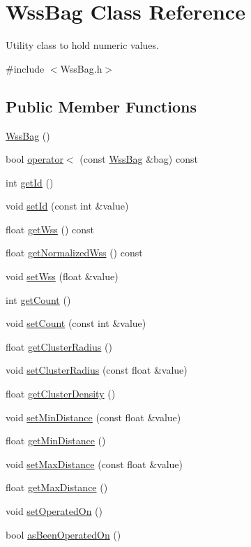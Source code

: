 \hypertarget{class_wss_bag}{}\section{Wss\+Bag Class Reference}
\label{class_wss_bag}


Utility class to hold numeric values.  




{\ttfamily \#include $<$Wss\+Bag.\+h$>$}

\subsection*{Public Member Functions}
\begin{DoxyCompactItemize}
\item 
\hyperlink{class_wss_bag_a67435486174798f81a34887ef2e043b8}{Wss\+Bag} ()
\item 
bool \hyperlink{class_wss_bag_af78f05046f501370d2f9fdd357229d5d}{operator$<$} (const \hyperlink{class_wss_bag}{Wss\+Bag} \&bag) const
\item 
int \hyperlink{class_wss_bag_ac82edcabdc9453934746a78f06cd5532}{get\+Id} ()
\item 
void \hyperlink{class_wss_bag_a0e2859dfdb070ff7a8fe0c5ba4135af7}{set\+Id} (const int \&value)
\item 
float \hyperlink{class_wss_bag_a4deab0c34ec6854d559eac6826e7f72d}{get\+Wss} () const
\item 
float \hyperlink{class_wss_bag_a636fe904ed2f9154bd33fb5feb254961}{get\+Normalized\+Wss} () const
\item 
void \hyperlink{class_wss_bag_a2a36ac684d72b7e8f29b302c0805a978}{set\+Wss} (float \&value)
\item 
int \hyperlink{class_wss_bag_a8f0597beadf6a65bac27b59d775eabbb}{get\+Count} ()
\item 
void \hyperlink{class_wss_bag_a4467a111c05bfced71e799414fa6144c}{set\+Count} (const int \&value)
\item 
float \hyperlink{class_wss_bag_ad81f1788775aa9c340d2f215b267e7e8}{get\+Cluster\+Radius} ()
\item 
void \hyperlink{class_wss_bag_af79ca518bffb8df641655b70707c3f1a}{set\+Cluster\+Radius} (const float \&value)
\item 
float \hyperlink{class_wss_bag_a1f785231b3bb2d7737bed7022a46b4e6}{get\+Cluster\+Density} ()
\item 
void \hyperlink{class_wss_bag_a5e55486287410b7b51cc31a8af115d58}{set\+Min\+Distance} (const float \&value)
\item 
float \hyperlink{class_wss_bag_a342ec7f142cd7d31c926c878667f2f2e}{get\+Min\+Distance} ()
\item 
void \hyperlink{class_wss_bag_aa8d3109ab823231b0001ceeca68e1a2b}{set\+Max\+Distance} (const float \&value)
\item 
float \hyperlink{class_wss_bag_ae6544449a24ffde79a2680d98c1e1d52}{get\+Max\+Distance} ()
\item 
void \hyperlink{class_wss_bag_aa53e281e368b34888f30c2c3cef4435c}{set\+Operated\+On} ()
\item 
bool \hyperlink{class_wss_bag_aa806ac9a3dd391c3a0579db62babb380}{as\+Been\+Operated\+On} ()
\end{DoxyCompactItemize}
